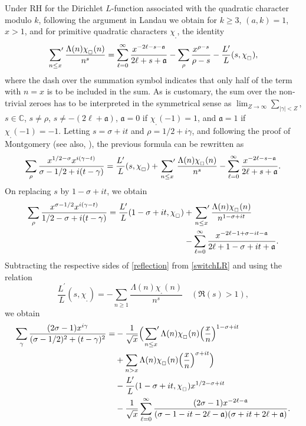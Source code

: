 \documentclass[pdflatex]{sn-jnl}%
\theoremstyle{sltheorems}
\theoremstyle{plainrem}
\theoremstyle{definition}
\begin{document}
Under RH for the Dirichlet $L$-function associated with the quadratic character
modulo $k$, following the argument in Landau \cite[p.~353]{LandauHand} we obtain for $k\ge 3$,
$(a,k)=1$, $x > 1$, and for primitive quadratic characters $\chi_{_{\square}}$, the identity
\[
\sideset{}{'} \sum_{n\le  x} \frac{\Lambda(n)\chi_{_{\square}}(n)}{n^s}
=
\sum_{\ell=0}^{\infty}\frac{x^{-2\ell-s-\mathfrak{a}}}{2\ell+s+\mathfrak{a}}
-
\sum_{\rho}\frac{x^{\rho-s}}{\rho-s}
-
\frac{L^\prime}{L}(s,\chi_{_{\square}}),
\]
where the dash over the summation symbol indicates that only half of
the term with 
$n = x$ is to be included in the sum. As is customary,
the sum over the non-trivial zeroes has to be interpreted in 
the symmetrical 
sense as $ \lim_{Z \to \infty} \sum_{ \vert \gamma \vert  < Z}$,
$s\in \mathbb C$,
$s\ne \rho$, $s\ne -(2\ell+\mathfrak{a})$,
$\mathfrak{a} =0$ if $\chi_{_{\square}}(-1)=1$, and
$\mathfrak{a} =1$ if $\chi_{_{\square}}(-1)=-1$.
%
Letting $s=\sigma+it$ and $\rho=1/2+i\gamma$, 
and following the proof of Montgomery \cite[pp.~185--186]{Montgomery1973} (see also, \cite[\S 3]{mathannalen}),
the previous formula can be rewritten as
%
\begin{equation}
\label{switchLR}
\sum_{\rho}
\frac{x^{1/2-\sigma}x^{i(\gamma-t)}}{\sigma-1/2 +i(t-\gamma)}
=
 \frac{L^\prime}{L}(s,\chi_{_{\square}})
 +
\sideset{}{'} \sum_{n\le  x} \frac{\Lambda(n)\chi_{_{\square}}(n)}{n^s}
-
\sum_{\ell=0}^{\infty}\frac{x^{-2\ell-s-\mathfrak{a}}}{2\ell+s+\mathfrak{a}}
.
\end{equation}
On replacing $s$ by $1-\sigma+it$, we obtain
%
\begin{align}
\notag
\sum_{\rho}\frac{x^{\sigma-1/2}x^{i(\gamma-t)}}{1/2-\sigma +i(t-\gamma)}
=
\frac{L^\prime}{L}(1-\sigma+it,\chi_{_{\square}})
& +
\sideset{}{'} \sum_{n\le  x} \frac{\Lambda(n)\chi_{_{\square}}(n)}{n^{1-\sigma+it}}
\\& 
\label{reflection}
-
\sum_{\ell=0}^{\infty}\frac{x^{-2\ell-1 + \sigma -it-\mathfrak{a}}}{2\ell+1 - \sigma +it+\mathfrak{a}}
.
\end{align}
%
Subtracting the respective sides of \eqref{reflection} from \eqref{switchLR} 
and using the relation 
%
\begin{equation}
\label{derlog-L}
 \frac{L^\prime}{L}(s,\chi_{_{\square}})
 =
 - \sum_{n\ge 1} \frac{\Lambda(n)\chi_{_{\square}}(n)}{n^s}
 \quad (\Re(s)>1),
\end{equation}
%
 we obtain 
\begin{align}
\notag
\sum_{\gamma}
\frac{(2\sigma-1) x^{i\gamma}}{(\sigma -1/2)^{2}+(t-\gamma)^{2}}
=
& -\frac{1}{\sqrt{x}} 
\Bigl(
\sideset{}{'} \sum_{n\le x} 
\Lambda(n)\chi_{_{\square}}(n) \Bigl( \frac{x}{n} \Bigr)^{1-\sigma+it} 
\\&
\notag
+
\sum_{n > x} \Lambda(n)\chi_{_{\square}}(n) \Bigl( \frac{x}{n} \Bigr)^{\sigma+it} 
\Bigr)
 \\
&
-
\frac{L^\prime}{L}(1-\sigma+it, \chi_{_{\square}})
x^{1/2-\sigma+it} \nonumber \\
\label{Montgomery-eq-(22)}
&
-\frac{1}{\sqrt{x}} 
\sum_{\ell=0}^{\infty}
\frac{(2\sigma-1) x^{-2\ell-\mathfrak{a}}}{(\sigma-1-it-2\ell-\mathfrak{a} ) (\sigma+it+2\ell+\mathfrak{a})}.
\end{align}
\end{document}
